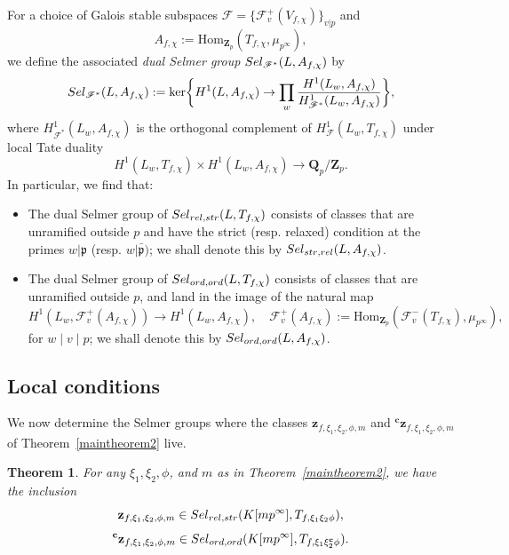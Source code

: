 \documentclass[10pt,letterpaper]{amsart}
\theoremstyle{plain}
\newtheorem{thm}{Theorem}[subsection] %
\theoremstyle{definition}
\theoremstyle{definition}
\theoremstyle{plain}
\theoremstyle{plain}
\theoremstyle{plain}
\theoremstyle{remark}
\numberwithin{equation}{section}
\newcommand{\cc}{\mathbf{c}}
\newcommand{\Sel}{Sel}
\newcommand{\pp}{\mathfrak{p}}
\newcommand{\ppbar}{\bar{\mathfrak{p}}}
\newcommand{\fkm}{\mathfrak{m}}
\newcommand{\relstr}{{{\rm rel},{\rm str}}}
\newcommand{\strrel}{{{\rm str},{\rm rel}}}
\newcommand{\ord}{{{\rm ord},{\rm ord}}}
\newcommand{\Q}{\mathbf{Q}}
\newcommand{\Z}{\mathbf{Z}}
\def\Sel{{\rm Sel}}
\begin{document}
For  %
 a choice of Galois stable subspaces $\mathscr{F}=\{\mathscr{F}_v^+(V_{f,\chi})\}_{v\vert p}$ and 
 \[A_{f,\chi}:={\mathrm{Hom}}_{\Z_p}(T_{f,\chi},\mu_{p^\infty}),\]
 we define the associated \emph{dual Selmer group} $\Sel_{\mathscr{F}^*}(L,A_{f,\chi})$ by
\[
\Sel_{\mathscr{F}^*}(L,A_{f,\chi}):={{\mathrm{ker}}}\biggl\{H^1(L,A_{f,\chi})\rightarrow\prod_{w}\frac{H^1(L_w,A_{f,\chi})}{H^1_{\mathscr{F}^*}(L_w,A_{f,\chi})}\biggr\},
\]
where $H^1_{\mathscr{F}^*}(L_w,A_{f,\chi})$ is the orthogonal complement of $H^1_{\mathscr{F}}(L_w,T_{f,\chi})$ under local Tate duality
\[
H^1(L_w,T_{f,\chi})\times H^1(L_w,A_{f,\chi})\rightarrow\Q_p/\Z_p.
\]
In particular, we find that:
\begin{itemize}
\item The dual Selmer group of $\Sel_{\relstr}(L,T_{f,\chi})$ consists of classes that are unramified outside $p$ and have the strict (resp. relaxed) condition at the primes $w\vert\pp$ (resp. $w\vert\ppbar)$; we shall denote this by $\Sel_{\strrel}(L,A_{f,\chi})$.
\item The dual Selmer group of $\Sel_{\ord}(L,T_{f,\chi})$ consists of classes that are unramified outside $p$, and land in the image of the natural map
\[
H^1(L_w,\mathscr{F}_v^+(A_{f,\chi}))\rightarrow H^1(L_w,A_{f,\chi}),\quad\textrm{$\mathscr{F}_v^+(A_{f,\chi}):={\mathrm{Hom}}_{\Z_p}(\mathscr{F}_v^-(T_{f,\chi}),\mu_{p^\infty})$,}
\]
for $w\mid v\mid p$; 
we shall denote this by $\Sel_{\ord}(L,A_{f,\chi})$.
\end{itemize}

\subsection{Local conditions} 

We now determine the Selmer groups where the classes $\mathbf{z}_{f,\xi_1,\xi_2,\phi,m}$ and  ${}^\cc\mathbf{z}_{f,\xi_1,\xi_2,\phi,m}$ of Theorem~\ref{maintheorem2} live.

\begin{thm}
\label{mainthm2-localcond}
For any $\xi_1,\xi_2,\phi$, and $m$ as in Theorem~\ref{maintheorem2}, we have the inclusion
\[
\mathbf{z}_{f,\xi_1,\xi_2,\phi,m}\in\Sel_{\relstr}(K[mp^\infty],T_{f,\xi_1\xi_2\phi}),
\]
\[
{}^{\cc}\mathbf{z}_{f,\xi_1,\xi_2,\phi,m}\in\Sel_{\ord}(K[mp^\infty],T_{f,\xi_1\xi_2^\cc\phi}).
\]
%
\end{thm}
\end{document}
